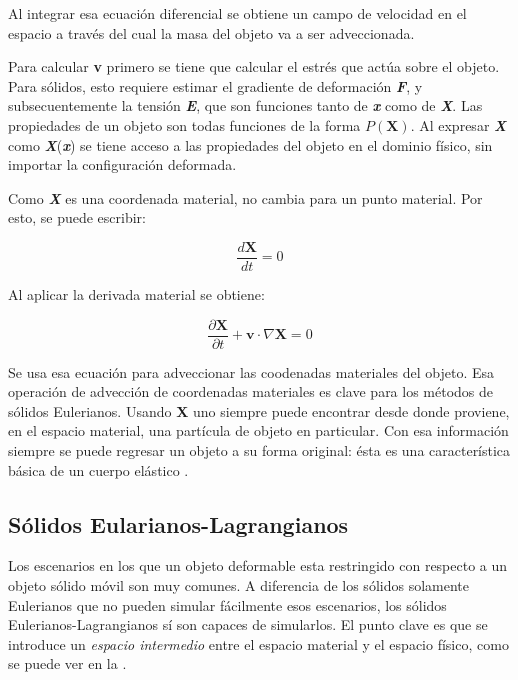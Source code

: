 Al integrar esa ecuación diferencial se obtiene un campo de velocidad en el espacio a través del cual la masa del objeto va a ser adveccionada. 

Para calcular \textbf{v} primero se tiene que calcular el estrés que actúa sobre el objeto. Para sólidos, esto requiere estimar el gradiente de deformación \textbf{\textit{F}}, y subsecuentemente la tensión \textbf{\textit{E}}, que son funciones tanto de \textbf{\textit{x}} como de \textbf{\textit{X}}. Las propiedades de un objeto son todas funciones de la forma $P(\textbf{X})$. Al expresar \textbf{\textit{X}} como \textbf{\textit{X}}(\textbf{\textit{x}}) se tiene acceso a las propiedades del objeto en el dominio físico, sin importar la configuración deformada.

Como \textbf{\textit{X}} es una coordenada material, no cambia para un punto material. Por esto, se puede escribir:

\begin{equation}
	\frac{d \textbf{X}}{d t} = 0
\end{equation}

Al aplicar la derivada material se obtiene:

\begin{equation}
	\frac{\partial \textbf{X}}{\partial t} + \textbf{v} \cdot \nabla \textbf{X} = 0
\end{equation}

Se usa esa ecuación para adveccionar las coodenadas materiales del objeto. Esa operación de advección de coordenadas materiales es clave para los métodos de sólidos Eulerianos. Usando \textbf{X} uno siempre puede encontrar desde donde proviene, en el espacio material, una partícula de objeto en particular. Con esa información siempre se puede regresar un objeto a su forma original: ésta es una característica básica de un cuerpo elástico \citep{pai2014eulerian}.

\subsection{Sólidos Eularianos-Lagrangianos}

Los escenarios en los que un objeto deformable esta restringido con respecto a un objeto sólido móvil son muy comunes. A diferencia de los sólidos solamente Eulerianos que no pueden simular fácilmente esos escenarios, los sólidos Eulerianos-Lagrangianos sí son capaces de simularlos. El punto clave es que se introduce un \textit{espacio intermedio} entre el espacio material y el espacio físico, como se puede ver en la .

